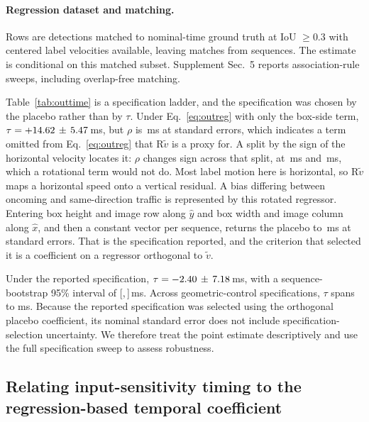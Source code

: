 \documentclass[10pt,twocolumn,letterpaper]{article}
\begin{document}
\paragraph{Regression dataset and matching.}
Rows are detections matched to nominal-time ground truth at IoU $\geq 0.3$ with centered
label velocities available, leaving \outMatches{} matches from \outSeqs{} sequences. The
estimate is conditional on this matched subset. Supplement Sec.~5 reports association-rule
sweeps, including overlap-free matching.

Table~\ref{tab:outtime} is a specification ladder, and the specification was
chosen by the placebo rather than by $\tau$. Under Eq.~\ref{eq:outreg} with only
the box-side term, $\tau=+14.62\,\pm\,5.47$\,ms, but $\rho$ is
\ladderMinPl\,ms at \ladderMinPlSigmas{} standard errors, which indicates a term
omitted from Eq.~\ref{eq:outreg} that $\mathrm{R}\tilde v$ is a proxy for. A split by
the sign of the horizontal velocity locates it: $\rho$ changes sign across that
split, at \plRight\,ms and \plLeft\,ms, which a rotational term would not do.
Most label motion here is horizontal, so $\mathrm{R}\tilde v$ maps a horizontal speed
onto a vertical residual. A bias differing between oncoming and same-direction
traffic is represented by this rotated regressor. Entering
box height and image row along $\hat{y}$ and box width and image column along
$\hat{x}$, and then a constant vector per sequence, returns the placebo to
\ladderFullPl\,ms at \ladderFullPlSigmas{} standard errors. That is the
specification reported, and the criterion that selected it is a coefficient on a
regressor orthogonal to $\tilde v$.

Under the reported specification, $\tau=-2.40\,\pm\,7.18$\,ms, with a
sequence-bootstrap 95\% interval of [\outBootLo,\,\outBootHi]\,ms. Across geometric-control
specifications, $\tau$ spans \satLo{} to \satHi{} ms. Because the reported specification was
selected using the orthogonal placebo coefficient, its nominal standard error does not include
specification-selection uncertainty. We therefore treat the point estimate descriptively and use
the full specification sweep to assess robustness.

\subsection{Relating input-sensitivity timing to the regression-based temporal coefficient}
\label{sec:extrapolation}
\end{document}

